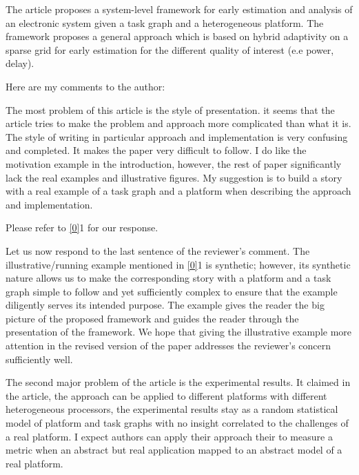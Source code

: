 \begin{reviewer}
The article proposes a system-level framework for early estimation and analysis
of an electronic system given a task graph and a heterogeneous platform. The
framework proposes a general approach which is based on hybrid adaptivity on a
sparse grid  for early estimation for the different quality of interest (e.e
power, delay).

Here are my comments to the author:

The most problem of this article is the style of presentation. it seems that the
article tries to make the problem and approach more complicated than what it is.
The style of writing in particular approach and implementation is very confusing
and completed. It makes the paper very difficult to follow. I do like the
motivation example in the introduction, however, the rest of paper significantly
lack the real examples and illustrative figures. My suggestion is to build a
story with a real example of a task graph and a platform when describing the
approach and implementation.
\end{reviewer}

\begin{authors}
Please refer to \cref{0}{1} for our response.

Let us now respond to the last sentence of the reviewer's comment. The
illustrative/running example mentioned in \cref{0}{1} is synthetic; however, its
synthetic nature allows us to make the corresponding story with a platform and a
task graph simple to follow and yet sufficiently complex to ensure that the
example diligently serves its intended purpose. The example gives the reader the
big picture of the proposed framework and guides the reader through the
presentation of the framework. We hope that giving the illustrative example more
attention in the revised version of the paper addresses the reviewer's concern
sufficiently well.

\begin{actions}
\end{actions}
\end{authors}

\begin{reviewer}
The second major problem of the article is the experimental results. It claimed
in the article, the approach can be applied to different platforms with
different heterogeneous processors, the experimental results stay as a random
statistical model of platform and task graphs with no insight correlated to the
challenges of a real platform. I expect authors can apply their approach their
to measure a metric when an abstract but real application mapped to an abstract
model of a real platform.
\end{reviewer}


